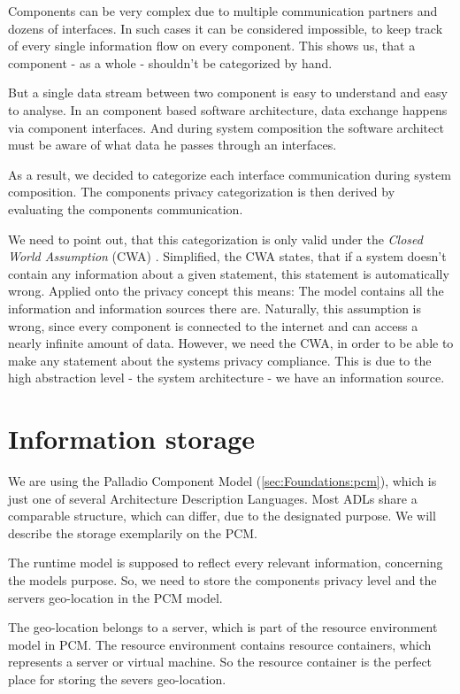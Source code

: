 Components can be very complex due to multiple communication partners and dozens of interfaces. In such cases it can be considered impossible, to keep track of every single information flow on every component. This shows us, that a component - as a whole - shouldn't be categorized by hand.

But a single data stream between two component is easy to understand and easy to analyse. In an component based software architecture, data exchange happens via component interfaces. And during system composition the software architect must be aware of what data he passes through an interfaces.

As a result, we decided to categorize each interface communication during system composition. The components privacy categorization is then derived by evaluating the components communication.

We need to point out, that this categorization is only valid under the \textit{Closed World Assumption} (CWA) \cite{Sequeda.CWA}. Simplified, the CWA states, that if a system doesn't contain any information about a given statement, this statement is automatically wrong. Applied onto the privacy concept this means: The model contains all the information and information sources there are. Naturally, this assumption is wrong, since every component is connected to the internet and can access a nearly infinite amount of data. However, we need the CWA, in order to be able to make any statement about the systems privacy compliance. This is due to the high abstraction level - the system architecture - we have an information source.


\section{Information storage}
\label{sec:PrivacyConcept:pcm}

We are using the Palladio Component Model (\autoref{sec:Foundations:pcm}), which is just one of several Architecture Description Languages. Most ADLs share a comparable structure, which can differ, due to the designated purpose. We will describe the storage exemplarily on the PCM.

The runtime model is supposed to reflect every relevant information, concerning the models purpose. So, we need to store the components privacy level and the servers geo-location in the PCM model.

The geo-location belongs to a server, which is part of the resource environment model in PCM. The resource environment contains resource containers, which represents a server or virtual machine. So the resource container is the perfect place for storing the severs geo-location.


